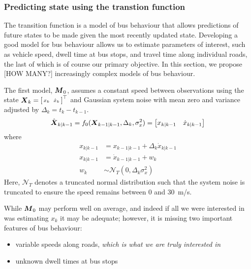 \subsubsection{Predicting state using the transtion function}
\label{sec:pf_prediction}

The transition function is a model of bus behaviour that allows
predictions of future states to be made given the most recently 
updated state.
Developing a good model for bus behaviour allows us to estimate
parameters of interest, such as vehicle speed,
dwell time at bus stops, and travel time along individual roads,
the last of which is of course our primary objective.
In this section, we propose [HOW MANY?] increasingly complex models
of bus behaviour.


The first model, $\mbox{$\boldsymbol{M}$}_0$, assumes a constant speed between observations
using the state
$\mbox{$\boldsymbol{X}$}_k = \left[\begin{smallmatrix}x_k && \dot x_k\end{smallmatrix}\right]^\top$
and Gaussian system noise with mean zero and variance adjusted by
$\Delta_k = t_k - t_{k-1}$.
\begin{equation*}
\hat{\mbox{$\boldsymbol{X}$}}_{k|k-1} = f_0(\mbox{$\boldsymbol{X}$}_{k-1|k-1}, \Delta_k, \sigma_x^2) =
\begin{bmatrix}
x_{k|k-1} & \dot x_{k|k-1}
\end{bmatrix}
\end{equation*}
where
\begin{align*}
x_{k|k-1} &= x_{k-1|k-1} + \Delta_k \dot x_{k|k-1} \\
x_{k|k-1} &= \dot x_{k-1|k-1} + w_k \\
w_k &\sim \mathcal{N}_T(0, \Delta_k \sigma_x^2)
\end{align*}
Here, $\mathcal{N}_T$ denotes a truncated normal distribution such that
the system noise is truncated to ensure the speed remains between 0 and 30~m/s.


While $\mbox{$\boldsymbol{M}$}_0$ may perform well on average,
and indeed if all we were interested in was estimating $x_k$ it may be adequate;
however, it is missing two important features of bus behaviour:
\begin{itemize}
\item variable speeds along roads, \emph{which is what we are truly interested in}
\item unknown dwell times at bus stops
\end{itemize}


